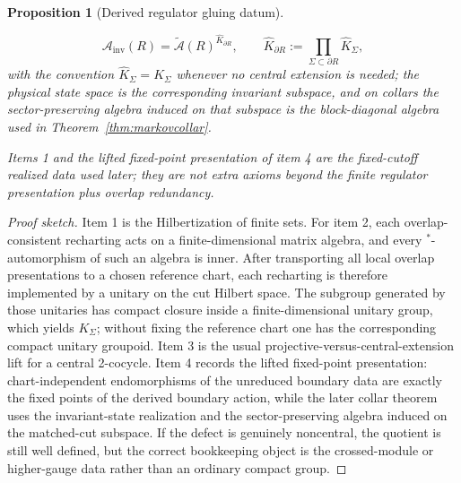 \documentclass[11pt]{article}
\newtheorem{proposition}[theorem]{Proposition}
\begin{document}
\begin{proposition}[Derived regulator gluing datum]
\begin{enumerate}[leftmargin=2em]
\[
\mathcal A_{\mathrm{inv}}(R)=\widetilde{\mathcal A}(R)^{\widehat K_{\partial R}},
\qquad
\widehat K_{\partial R}:=\prod_{\Sigma\subset\partial R}\widehat K_\Sigma,
\]
\noindent with the convention \(\widehat K_\Sigma=K_\Sigma\) whenever no central extension is needed; the physical state space is the corresponding invariant subspace, and on collars the sector-preserving algebra induced on that subspace is the block-diagonal algebra used in Theorem~\ref{thm:markovcollar}.
\end{enumerate}
Items 1 and the lifted fixed-point presentation of item 4 are the fixed-cutoff realized data used later; they are not extra axioms beyond the finite regulator presentation plus overlap redundancy.
\end{proposition}

\begin{proof}[Proof sketch]
Item 1 is the Hilbertization of finite sets. For item 2, each overlap-consistent recharting acts on a finite-dimensional matrix algebra, and every \(^*\)-automorphism of such an algebra is inner. After transporting all local overlap presentations to a chosen reference chart, each recharting is therefore implemented by a unitary on the cut Hilbert space. The subgroup generated by those unitaries has compact closure inside a finite-dimensional unitary group, which yields \(K_\Sigma\); without fixing the reference chart one has the corresponding compact unitary groupoid. Item 3 is the usual projective-versus-central-extension lift for a central 2-cocycle. Item 4 records the lifted fixed-point presentation: chart-independent endomorphisms of the unreduced boundary data are exactly the fixed points of the derived boundary action, while the later collar theorem uses the invariant-state realization and the sector-preserving algebra induced on the matched-cut subspace. If the defect is genuinely noncentral, the quotient is still well defined, but the correct bookkeeping object is the crossed-module or higher-gauge data rather than an ordinary compact group.
\end{proof}
\end{document}

